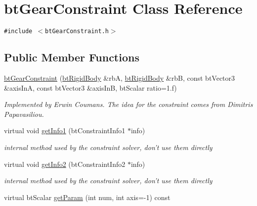 \hypertarget{classbt_gear_constraint}{
\section{btGearConstraint Class Reference}
\label{classbt_gear_constraint}
}
{\tt \#include $<$btGearConstraint.h$>$}

\subsection*{Public Member Functions}
\begin{CompactItemize}
\item 
\hypertarget{classbt_gear_constraint_ee33fd1dac22b6f0323757057204e891}{
\hyperlink{classbt_gear_constraint_ee33fd1dac22b6f0323757057204e891}{btGearConstraint} (\hyperlink{classbt_rigid_body}{btRigidBody} \&rbA, \hyperlink{classbt_rigid_body}{btRigidBody} \&rbB, const btVector3 \&axisInA, const btVector3 \&axisInB, btScalar ratio=1.f)}
\label{classbt_gear_constraint_ee33fd1dac22b6f0323757057204e891}

\begin{CompactList}\small\item\em Implemented by Erwin Coumans. The idea for the constraint comes from Dimitris Papavasiliou. \item\end{CompactList}\item 
\hypertarget{classbt_gear_constraint_e8e7d953740bff99eca4441b5d9c7eb1}{
virtual void \hyperlink{classbt_gear_constraint_e8e7d953740bff99eca4441b5d9c7eb1}{getInfo1} (btConstraintInfo1 $\ast$info)}
\label{classbt_gear_constraint_e8e7d953740bff99eca4441b5d9c7eb1}

\begin{CompactList}\small\item\em internal method used by the constraint solver, don't use them directly \item\end{CompactList}\item 
\hypertarget{classbt_gear_constraint_e1c6770b8835458389ca7ae3ce7dfb05}{
virtual void \hyperlink{classbt_gear_constraint_e1c6770b8835458389ca7ae3ce7dfb05}{getInfo2} (btConstraintInfo2 $\ast$info)}
\label{classbt_gear_constraint_e1c6770b8835458389ca7ae3ce7dfb05}

\begin{CompactList}\small\item\em internal method used by the constraint solver, don't use them directly \item\end{CompactList}\item 
\hypertarget{classbt_gear_constraint_a08a0ddb52aacfa0141b41b388238aa6}{
virtual btScalar \hyperlink{classbt_gear_constraint_a08a0ddb52aacfa0141b41b388238aa6}{getParam} (int num, int axis=-1) const }
\label{classbt_gear_constraint_a08a0ddb52aacfa0141b41b388238aa6}


\end{CompactItemize}
